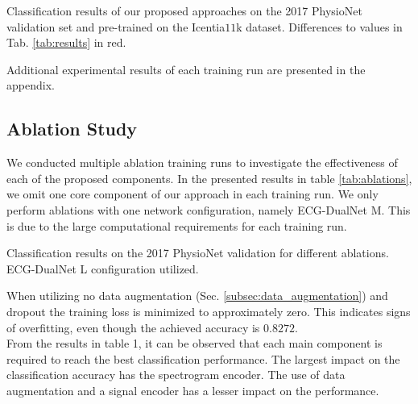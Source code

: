 \begin{table}[!ht]
    \centering
    \caption{Classification results of our proposed approaches on the 2017 PhysioNet validation set and pre-trained on the Icentia$11$k dataset. Differences to values in Tab. \ref{tab:results} in red.}
    
    \label{tab:pretraining_results}
\end{table}

Additional experimental results of each training run are presented in the appendix.

\subsection{Ablation Study} \label{subsec:ablations}

We conducted multiple ablation training runs to investigate the effectiveness of each of the proposed components. In the presented results in table \ref{tab:ablations}, we omit one core component of our approach in each training run. We only perform ablations with one network configuration, namely ECG-DualNet M. This is due to the large computational requirements for each training run.

\begin{table}[h!]
    \centering
    \caption{Classification results on the 2017 PhysioNet validation for different ablations. ECG-DualNet L configuration utilized.}
    
    \label{tab:ablations}
\end{table}

When utilizing no data augmentation (Sec. \ref{subsec:data_augmentation}) and dropout the training loss is minimized to approximately zero. This indicates signs of overfitting, even though the achieved accuracy is $0.8272$.\\
\indent From the results in table 1, it can be observed that each main component is required to reach the best classification performance. The largest impact on the classification accuracy has the spectrogram encoder. The use of data augmentation and a signal encoder has a lesser impact on the performance. 
